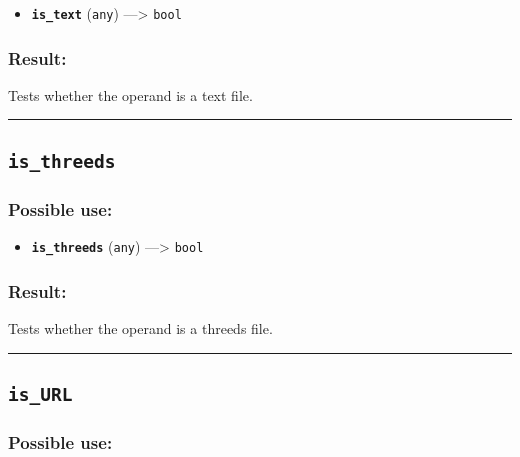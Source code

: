 \documentclass[]{book}
\providecommand{\tightlist}{%
  \setlength{\itemsep}{0pt}\setlength{\parskip}{0pt}}
\theoremstyle{definition}
\theoremstyle{definition}
\theoremstyle{definition}
\theoremstyle{remark}
\begin{document}
\begin{itemize}
\tightlist
\item
  \textbf{\texttt{is\_text}} (\texttt{any}) ---\textgreater{}
  \texttt{bool}
\end{itemize}

\subsubsection{Result:}\label{result-295}

Tests whether the operand is a text file.

\begin{center}\rule{0.5\linewidth}{\linethickness}\end{center}

\subsection{\texorpdfstring{\texttt{is\_threeds}}{is\_threeds}}\label{is_threeds}

\subsubsection{Possible use:}\label{possible-use-306}

\begin{itemize}
\tightlist
\item
  \textbf{\texttt{is\_threeds}} (\texttt{any}) ---\textgreater{}
  \texttt{bool}
\end{itemize}

\subsubsection{Result:}\label{result-296}

Tests whether the operand is a threeds file.

\begin{center}\rule{0.5\linewidth}{\linethickness}\end{center}

\subsection{\texorpdfstring{\texttt{is\_URL}}{is\_URL}}\label{is_url}

\subsubsection{Possible use:}\label{possible-use-307}
\end{document}

